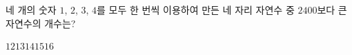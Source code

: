 \hspace*{2mm}\begin{minipage}[t]{\dimexpr\linewidth-2mm\relax}\vspace{0pt}
네 개의 숫자 $1$, $2$, $3$, $4$를 모두 한 번씩 이용하여 만든 네 자리 자연수 중 $2400$보다 큰 자연수의 개수는?
\begin{choices32}{$12$}{$13$}{$14$}{$15$}{$16$}\end{choices32}\end{minipage}

